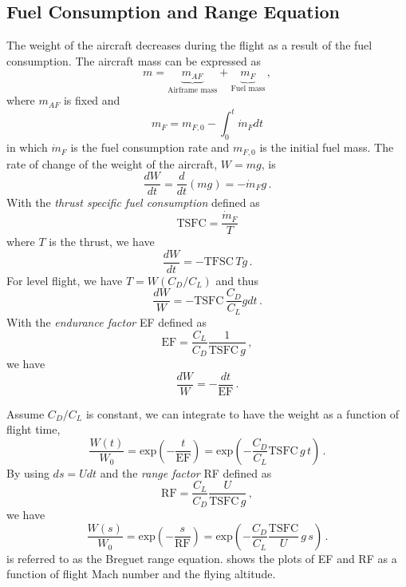\subsection{Fuel Consumption and Range Equation}
The weight of the aircraft decreases during the flight as a result of the fuel consumption. The aircraft mass can be expressed as
\begin{equation}
  m = \underbrace{m_{AF}}_{\text{Airframe mass}} + \underbrace{m_F}_{\text{Fuel mass}} \, ,
\end{equation}
where $m_{AF}$ is fixed and 
\begin{equation}
  m_F = m_{F, 0} - \int_0^t \dot{m}_F dt
\end{equation}
in which $\dot{m}_F$ is the fuel consumption rate and $m_{F,0}$ is the initial fuel mass. The rate of change of the weight of the aircraft, $W = mg$, is
\begin{equation}
  \frac{dW}{dt} = \frac{d}{dt}(mg) = - \dot{m}_F g \, .
\end{equation}
With the {\it thrust specific fuel consumption} defined as
\begin{equation}
  \text{TSFC} = \frac{\dot{m}_F}{T}
\end{equation}
where $T$ is the thrust, we have
\begin{equation}
  \frac{dW}{dt} = - \text{TFSC}\, T g\,.
\end{equation}
For level flight, we have $T = W (C_D/C_L)$ and thus
\begin{equation}
  \frac{dW}{W} = - \text{TSFC} \, \frac{C_D}{C_L} g dt\,.
\end{equation}
With the {\it endurance factor} EF defined as
\begin{equation}
\text{EF} = \frac{C_L}{C_D} \frac{1}{\text{TSFC} \,g}\,,
\end{equation}
we have 
\begin{equation}
\frac{dW}{W} = -\frac{dt}{\text{EF}}\,.
\end{equation}

Assume $C_D/C_L$ is constant, we can integrate to have the weight as a function of flight time,
\begin{equation}
  \frac{W(t)}{W_0} = \text{exp}\left(-\frac{t}{\text{EF}}\right) = \text{exp}\left(-\frac{C_D}{C_L} \text{TSFC} \, g \,t\right) \,.
\end{equation}
By using $ds = U dt$ and the {\it range factor} RF defined as 
\begin{equation}
\text{RF} = \frac{C_L}{C_D} \frac{U}{\text{TSFC} \,g}\,,
\end{equation}
we have
\begin{equation}
  \label{eqn:BRE}
  \frac{W(s)}{W_0} = \text{exp}\left(-\frac{s}{\text{RF}}\right) = \text{exp}\left(-\frac{C_D}{C_L} \frac{\text{TSFC}}{U} \, g \,s\right) \,.
\end{equation}
 is referred to as the Breguet range equation.  shows the plots of EF and RF as a function of flight Mach number and the flying altitude.

